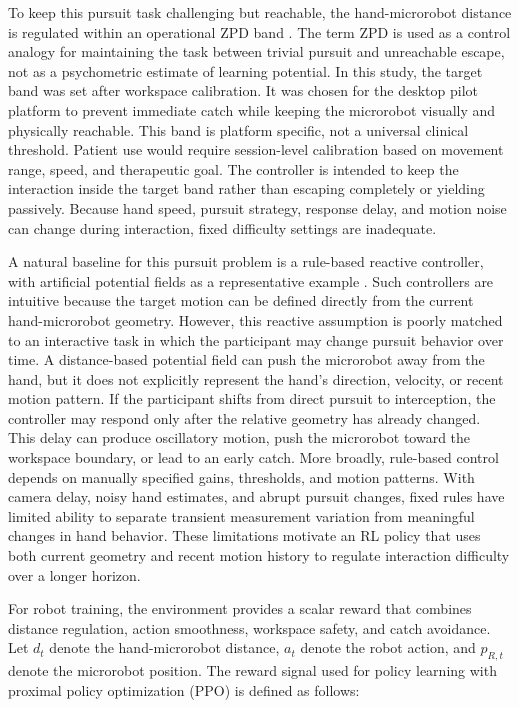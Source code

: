 \documentclass[journal,twoside,web]{ieeecolor2}
\begin{document}
To keep this pursuit task challenging but reachable, the hand-microrobot distance is regulated within an operational ZPD band \cite{vygotskyMindSociety1978,hocineSeriousGameAdaptation2015}. The term ZPD is used as a control analogy for maintaining the task between trivial pursuit and unreachable escape, not as a psychometric estimate of learning potential. In this study, the target band was set after workspace calibration. It was chosen for the desktop pilot platform to prevent immediate catch while keeping the microrobot visually and physically reachable. This band is platform specific, not a universal clinical threshold. Patient use would require session-level calibration based on movement range, speed, and therapeutic goal. The controller is intended to keep the interaction inside the target band rather than escaping completely or yielding passively. Because hand speed, pursuit strategy, response delay, and motion noise can change during interaction, fixed difficulty settings are inadequate.

A natural baseline for this pursuit problem is a rule-based reactive controller, with artificial potential fields as a representative example \cite{khatibObstacleAvoidance1986,leeVirtualHillAPF2024}. Such controllers are intuitive because the target motion can be defined directly from the current hand-microrobot geometry. However, this reactive assumption is poorly matched to an interactive task in which the participant may change pursuit behavior over time. A distance-based potential field can push the microrobot away from the hand, but it does not explicitly represent the hand's direction, velocity, or recent motion pattern. If the participant shifts from direct pursuit to interception, the controller may respond only after the relative geometry has already changed. This delay can produce oscillatory motion, push the microrobot toward the workspace boundary, or lead to an early catch. More broadly, rule-based control depends on manually specified gains, thresholds, and motion patterns. With camera delay, noisy hand estimates, and abrupt pursuit changes, fixed rules have limited ability to separate transient measurement variation from meaningful changes in hand behavior. These limitations motivate an RL policy that uses both current geometry and recent motion history to regulate interaction difficulty over a longer horizon.

For robot training, the environment provides a scalar reward that combines distance regulation, action smoothness, workspace safety, and catch avoidance. Let $d_t$ denote the hand-microrobot distance, $a_t$ denote the robot action, and $p_{R,t}$ denote the microrobot position. The reward signal used for policy learning with proximal policy optimization (PPO) \cite{schulmanPPO2017} is defined as follows:
\end{document}
